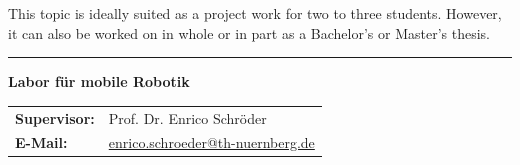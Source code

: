 \documentclass{ohm_project_description}
\begin{document}
\vspace{0.5cm}
This topic is ideally suited as a project work for two to three students. However, it can also be worked on in whole or in part as a Bachelor's or Master's thesis. 


\vfill
\textcolor{ohm_red}{\rule{\linewidth}{0.4mm}}
\textbf{\textcolor{ohm_red}{Labor für mobile Robotik}} \\
\begin{tabular}{@{}ll}
\textbf{Supervisor:} & Prof. Dr. Enrico Schröder \\
\textbf{E-Mail:}   & \href{mailto:enrico.schroeder@th-nuernberg.de}{enrico.schroeder@th-nuernberg.de} \\
\end{tabular}
\end{document}
